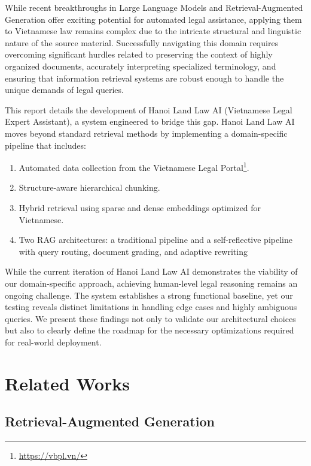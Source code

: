 \documentclass[letterpaper]{article} %
\begin{document}
While recent breakthroughs in Large Language Models and Retrieval-Augmented Generation offer exciting potential for automated legal assistance, applying them to Vietnamese law remains complex due to the intricate structural and linguistic nature of the source material. Successfully navigating this domain requires overcoming significant hurdles related to preserving the context of highly organized documents, accurately interpreting specialized terminology, and ensuring that information retrieval systems are robust enough to handle the unique demands of legal queries.

This report details the development of Hanoi Land Law AI (Vietnamese Legal Expert Assistant), a system engineered to bridge this gap. Hanoi Land Law AI moves beyond standard retrieval methods by implementing a domain-specific pipeline that includes:

\begin{enumerate}
	\item Automated data collection from the Vietnamese Legal Portal\footnote{\url{https://vbpl.vn/}}.
	\item Structure-aware hierarchical chunking.
	\item Hybrid retrieval using sparse and dense embeddings optimized for Vietnamese.
	\item Two RAG architectures: a traditional pipeline and a self-reflective pipeline with query routing, document grading, and adaptive rewriting
\end{enumerate}

While the current iteration of Hanoi Land Law AI demonstrates the viability of our domain-specific approach, achieving human-level legal reasoning remains an ongoing challenge. The system establishes a strong functional baseline, yet our testing reveals distinct limitations in handling edge cases and highly ambiguous queries. We present these findings not only to validate our architectural choices but also to clearly define the roadmap for the necessary optimizations required for real-world deployment.

\section{Related Works}

\subsection{Retrieval-Augmented Generation}
\end{document}
